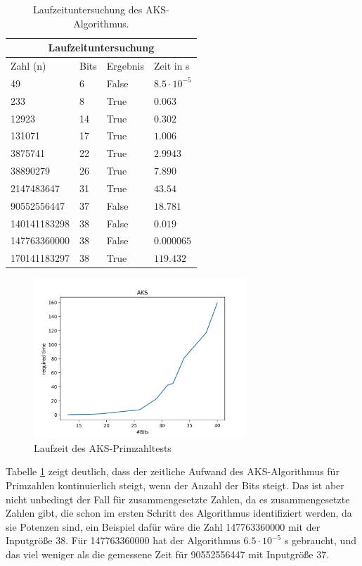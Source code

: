 \documentclass[12pt,oneside]{article}
\theoremstyle{remark}
\theoremstyle{definition}
\begin{document}
\begin{table}[h!]
\centering
\begin{tabular}{ |p{3cm}||p{3cm}|p{3cm}|p{3cm}|  }
 \hline
 \multicolumn{4}{|c|}{Laufzeituntersuchung} \\
 \hline
 Zahl (n)& Bits &Ergebnis&Zeit in s\\
 \hline
 49   & 6    &False&   $8.5 \cdot 10^{-5}$\\
 233&   8  & True   &$0.063$\\
 12923 &14 & True&  $0.302$\\
 131071    &17 & True&  $1.006$\\
 3875741& 22  & True   &$2.9943$\\
 38890279& 26  & True& $7.890$\\
 2147483647&   31  & True& $43.54$\\
 90552556447&   37  & False& $18.781$\\
 140141183298&   38  & False& $0.019$\\
 147763360000&   38  & False& $0.000065$\\
 170141183297& 38 & True& $119.432$\\
 \hline
\end{tabular}
 \caption{Laufzeituntersuchung des AKS-Algorithmus.}
\label{table:3}
\end{table}

\begin{figure}[h]
\includegraphics[width=8cm]{plots/aks.png}
\centering
\caption{Laufzeit des AKS-Primzahltests}
\end{figure}


Tabelle \ref{table:3} zeigt deutlich, dass der zeitliche Aufwand des AKS-Algorithmus für Primzahlen kontinuierlich steigt, wenn der Anzahl der Bits steigt. Das ist aber nicht unbedingt der Fall für zusammengesetzte Zahlen, da es zusammengesetzte Zahlen gibt, die schon im ersten Schritt des Algorithmus identifiziert werden, da sie Potenzen sind, ein Beispiel dafür wäre die Zahl 147763360000 mit der Inputgröße 38. Für 147763360000 hat der Algorithmus $6.5 \cdot 10^{-5}$ s gebraucht, und das viel weniger als die gemessene Zeit für 90552556447 mit Inputgröße 37.  
\end{document}
